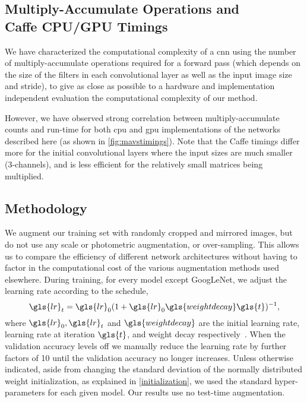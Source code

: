 \documentclass[thesis]{subfiles}
\begin{document}
    \subsection[Multiply-Accumulate Operations and Caffe CPU/GPU Timings]{Multiply-Accumulate Operations and\texorpdfstring{\\}{ }Caffe CPU/GPU Timings}\label{mavstimings}
    We have characterized the computational complexity of a \gls{cnn} using the number of multiply-accumulate operations required for a forward pass (which depends on the size of the filters in each convolutional layer as well as the input image size and stride), to give as close as possible to a hardware and implementation independent evaluation the computational complexity of our method.
    
    However, we have observed strong correlation between multiply-accumulate counts and run-time for both \gls{cpu} and \gls{gpu} implementations of the networks described here (as shown in \cref{fig:mavstimings}). Note that the Caffe timings differ more for the initial convolutional layers where the input sizes are much smaller (3-channels), and  is less efficient for the relatively small matrices being multiplied.
    
    \subsection{Methodology}
    We augment our training set with randomly cropped and mirrored images, but do not use any scale or photometric augmentation, or over-sampling. This allows us to compare the efficiency of different network architectures without having to factor in the computational cost of the various augmentation methods used elsewhere. During training, for every model except GoogLeNet, we adjust the learning rate according to the schedule,
    \begin{equation}
        \gls{lr}_t = \gls{lr}_0(1+\gls{lr}_0\gls{weightdecay} \gls{t})^{-1},
    \end{equation}
    where $\gls{lr}_0,\gls{lr}_t$ and $\gls{weightdecay}$ are the initial learning rate, learning rate at iteration $\gls{t}$, and weight decay respectively~\citep{Bottou2012sgdtricks}. When the validation accuracy levels off we manually reduce the learning rate by further factors of 10 until the validation accuracy no longer increases. Unless otherwise indicated, aside from changing the standard deviation of the normally distributed weight initialization, as explained in \cref{initialization}, we used the standard hyper-parameters for each given model. Our results use no test-time augmentation.  
    
\end{document}
